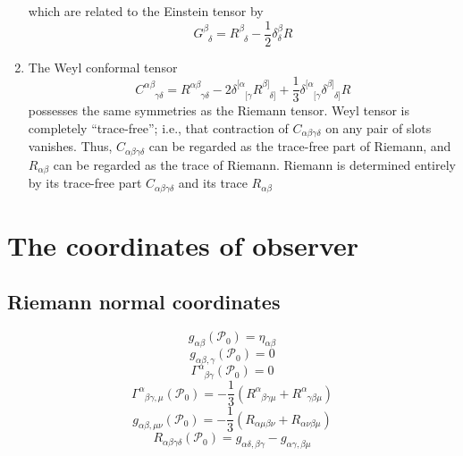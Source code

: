 \begin{enumerate}
which are related to the Einstein tensor by 
\[G^{\beta}_{\phantom{\beta}\delta} =  R^{\beta}_{\phantom{\beta}\delta} - \frac{1}{2} \delta^{\beta}_{\delta}R\]
\item The Weyl conformal tensor
\[C^{\alpha \beta}_{\phantom{\alpha \beta} \gamma \delta} = R^{\alpha \beta}_{\phantom{\alpha \beta} \gamma \delta} -2 \delta^{[\alpha}_{\phantom{[\alpha}[\gamma} R^{\beta]}_{\phantom{\beta]}\delta]} + \frac{1}{3} \delta^{[\alpha}_{\phantom{[\alpha}[\gamma} \delta^{\beta]}_{\phantom{\beta]}\delta]} R \]
possesses the same symmetries as the Riemann tensor. 
Weyl tensor is completely ``trace-free''; i.e., that
contraction of $C_{\alpha \beta \gamma \delta}$ on any pair of slots vanishes. Thus, $C_{\alpha \beta \gamma \delta}$ can be regarded as the trace-free part of Riemann, and $R_{\alpha \beta}$ can be regarded as the trace of Riemann. Riemann is determined entirely by its trace-free part $C_{\alpha \beta \gamma \delta}$ and
its trace $R_{\alpha \beta}$
\end{enumerate}

\section{The coordinates of observer}
\subsection{Riemann normal coordinates}
\[g_{\alpha \beta}(\mathcal{P}_0) = \eta_{\alpha \beta}\]
\[g_{\alpha \beta,\gamma}(\mathcal{P}_0) = 0\]
\[\Gamma^{\alpha}_{\phantom{\alpha} \beta \gamma}(\mathcal{P}_0) = 0\]
\[\Gamma^{\alpha}_{\phantom{\alpha} \beta \gamma,\mu}(\mathcal{P}_0) = -\frac{1}{3} (R^{\alpha}_{\phantom{\alpha} \beta \gamma \mu} + R^{\alpha}_{\phantom{\alpha} \gamma \beta \mu})\]
\[g_{\alpha \beta,\mu \nu}(\mathcal{P}_0) = -\frac{1}{3} (R_{\alpha \mu \beta \nu} +R_{\alpha \nu \beta \mu})\]
\[R_{\alpha \beta \gamma \delta}(\mathcal{P}_0) = g_{\alpha \delta, \beta \gamma} - g_{\alpha \gamma , \beta \mu}\]

